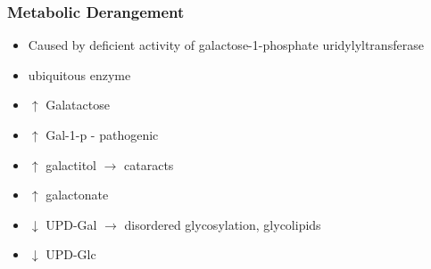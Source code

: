 \documentclass{scrartcl}
\begin{document}
\subsubsection{Metabolic Derangement}
\label{sec:org637062f}
\begin{itemize}
\item Caused by deficient activity of galactose-1-phosphate uridylyltransferase
\item ubiquitous enzyme
\item \(\uparrow\)  Galatactose
\item \(\uparrow\) Gal-1-p - pathogenic
\item \(\uparrow\)  galactitol \(\to\) cataracts
\item \(\uparrow\) galactonate
\item \(\downarrow\) UPD-Gal \(\to\) disordered glycosylation, glycolipids
\item \(\downarrow\) UPD-Glc
\end{itemize}
\end{document}
